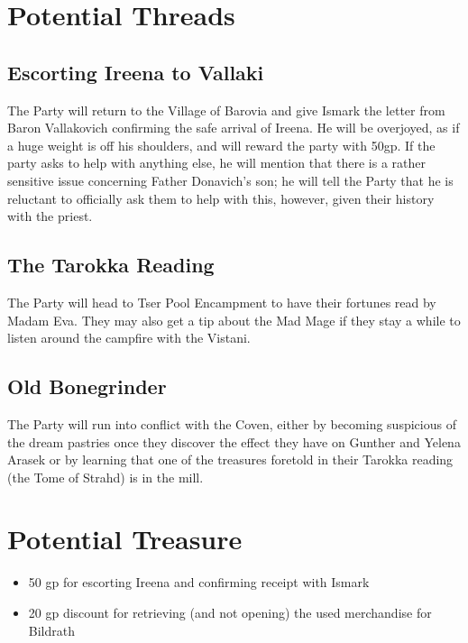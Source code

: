 \documentclass[a4paper,11pt]{article}
\begin{document}
\section{Potential Threads}
\label{sec:PotentialThreads}
\subsection{Escorting Ireena to Vallaki}
The Party will return to the Village of Barovia and give Ismark the letter from Baron Vallakovich confirming the
safe arrival of Ireena. He will be overjoyed, as if a huge weight is off his shoulders, and will reward the party
with 50gp. If the party asks to help with anything else, he will mention that there is a rather sensitive issue
concerning Father Donavich's son; he will tell the Party that he is reluctant to officially ask them to help with 
this, however, given their history with the priest.

\subsection{The Tarokka Reading}
The Party will head to Tser Pool Encampment to have their fortunes read by Madam Eva. They may also get a tip
about the Mad Mage if they stay a while to listen around the campfire with the Vistani.

\subsection{Old Bonegrinder}
The Party will run into conflict with the Coven, either by becoming suspicious of the dream pastries once they
discover the effect they have on Gunther and Yelena Arasek or by learning that one of the treasures foretold in
their Tarokka reading (the Tome of Strahd) is in the mill.

\section{Potential Treasure}
\label{sec:PotentialTreasure}
\begin{itemize}
  \item 50 gp for escorting Ireena and confirming receipt with Ismark
  \item 20 gp discount for retrieving (and not opening) the used merchandise for Bildrath
\end{itemize}
\end{document}
